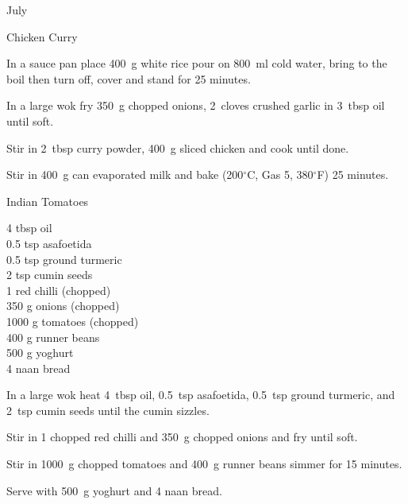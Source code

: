 \begin{menu}{July}
\begin{recipe}{2}{Chicken Curry}
\begin{ingredients}
		\end{ingredients}
	
	
	
    \begin{instructions}
    \item 
    In a
    sauce pan
    place
    400~g  white rice
    pour on
    800~ml  cold water,
    bring to the boil then turn off, cover and stand for 25 minutes.
  \item 
        In a large wok fry
        350~g chopped onions,
        2~cloves crushed garlic
        in
        3~tbsp  oil
        until soft.
      \item 
        Stir in
        2~tbsp  curry powder,
        400~g sliced chicken
        and cook until done.
      \item 
        Stir in
        400~g  can evaporated milk
        and
        bake (200$^{\circ}$C, Gas 5, 380$^{\circ}$F) 25 minutes.
      
    \end{instructions}
    \end{recipe}%
  
    \begin{recipe}{2}{Indian Tomatoes}%
		\begin{ingredients}
		4 tbsp oil  \\
	0.5 tsp asafoetida  \\
	0.5 tsp ground turmeric  \\
	2 tsp cumin seeds  \\
	1  red chilli (chopped) \\
	350 g onions (chopped) \\
	1000 g tomatoes (chopped) \\
	400 g runner beans  \\
	500 g yoghurt  \\
	4  naan bread  \\
	
		\end{ingredients}
	
	
    \begin{instructions}
    \item 
        In a large wok heat
        4~tbsp  oil,
        0.5~tsp  asafoetida,
        0.5~tsp  ground turmeric,
        and
        2~tsp  cumin seeds
        until
        the cumin sizzles.
      \item 
        Stir in
        1 chopped red chilli
        and
        350~g chopped onions
        and
        fry until soft.
      \item 
        Stir in
        1000~g chopped tomatoes
        and
        400~g  runner beans
        simmer for 15 minutes.
      \item 
        Serve with
        500~g  yoghurt
        and
        4  naan bread.
      

\end{instructions}
\end{recipe}
\end{menu}
